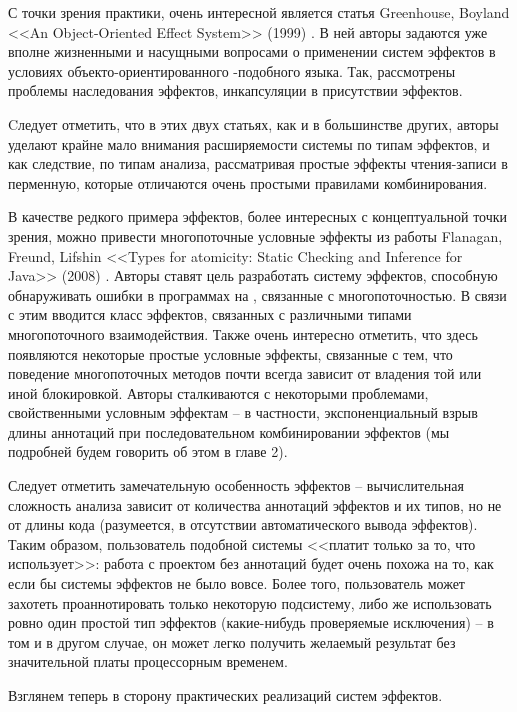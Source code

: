 С точки зрения практики, очень интересной является статья Greenhouse, Boyland <<An Object-Oriented Effect System>> (1999) \cite{Green99}. В ней авторы задаются уже вполне жизненными и насущными вопросами о применении систем эффектов в условиях объекто-ориентированного -подобного языка. Так, рассмотрены проблемы наследования эффектов, инкапсуляции в присутствии эффектов.

Cледует отметить, что в этих двух статьях, как и в большинстве других, авторы уделают крайне мало внимания расширяемости системы по типам эффектов, и как следствие, по типам анализа, рассматривая простые  эффекты чтения-записи в перменную, которые отличаются очень простыми правилами комбинирования. 

В качестве редкого примера эффектов, более интересных с концептуальной точки зрения, можно привести многопоточные условные эффекты из работы Flanagan, Freund, Lifshin <<Types for atomicity: Static Checking and Inference for Java>> (2008) \cite{Flanagan08}. Авторы ставят цель разработать систему эффектов, способную обнаруживать ошибки в программах на , связанные с многопоточностью. В связи с этим вводится класс эффектов, связанных с различными типами многопоточного взаимодействия. Также очень интересно отметить, что здесь появляются некоторые простые условные эффекты, связанные с тем, что поведение многопоточных методов почти всегда зависит от владения той или иной блокировкой. Авторы сталкиваются с некоторыми проблемами, свойственными условным эффектам -- в частности, экспоненциальный взрыв длины аннотаций при последовательном комбинировании эффектов (мы подробней будем говорить об этом в главе 2). 

Следует отметить замечательную особенность эффектов -- вычислительная сложность анализа зависит от количества аннотаций эффектов и их типов, но не от длины кода (разумеется, в отсутствии автоматического вывода эффектов). Таким образом, пользователь подобной системы <<платит только за то, что использует>>: работа с проектом без аннотаций будет очень похожа на то, как если бы системы эффектов не было вовсе. Более того, пользователь может захотеть проаннотировать только некоторую подсистему, либо же использовать ровно один простой тип эффектов (какие-нибудь проверяемые исключения) -- в том и в другом случае, он может легко получить желаемый результат без значительной платы процессорным временем. 


\bigskip

Взглянем теперь в сторону практических реализаций систем эффектов.

